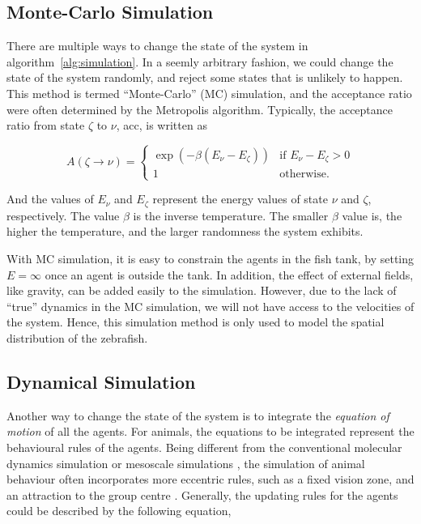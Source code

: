 \documentclass[11pt,twoside]{report}
\begin{document}
\subsection{Monte-Carlo Simulation}

There are multiple ways to change the state of the system in algorithm~\ref{alg:simulation}. In a seemly arbitrary fashion, we could change the state of the system randomly, and reject some states that is unlikely to happen. This method is termed ``Monte-Carlo'' (MC) simulation, and the acceptance ratio were often determined by the Metropolis algorithm. Typically, the acceptance ratio from state $\zeta$ to $\nu$, \gls{acc}, is written as

\[
	A(\zeta \rightarrow \nu) = \left\{
		\begin{array}{ll}
			\exp\left(-\beta(E_\nu - E_\zeta)\right)
			& \mbox{if $E_\nu - E_\zeta > 0$}\\
			1 & \mbox{otherwise.}
		\end{array}
	\right.
\]

\noindent And the values of $E_\nu$ and $E_\zeta$ represent the energy values of state $\nu$ and $\zeta$, respectively. The value $\beta$ is the inverse temperature. The smaller $\beta$ value is, the higher the temperature, and the larger randomness the system exhibits.

With MC simulation, it is easy to constrain the agents in the fish tank, by setting $E = \infty$ once an agent is outside the tank. In addition, the effect of external fields, like gravity, can be added easily to the simulation. However, due to the lack of ``true'' dynamics in the MC simulation, we will not have access to the velocities of the system. Hence, this simulation method is only used to model the spatial distribution of the zebrafish.


\subsection{Dynamical Simulation}


Another way to change the state of the system is to integrate the \emph{equation of motion} of all the agents. For animals, the equations to be integrated represent the behavioural rules of the agents.
Being different from the conventional molecular dynamics simulation or mesoscale simulations \cite{allen2017}, the simulation of animal behaviour often incorporates more eccentric rules, such as a fixed vision zone\cite{couzin2002, yigit2020}, and an attraction to the group centre \cite{reynolds1987}. Generally, the updating rules for the agents could be described by the following equation,
\end{document}
